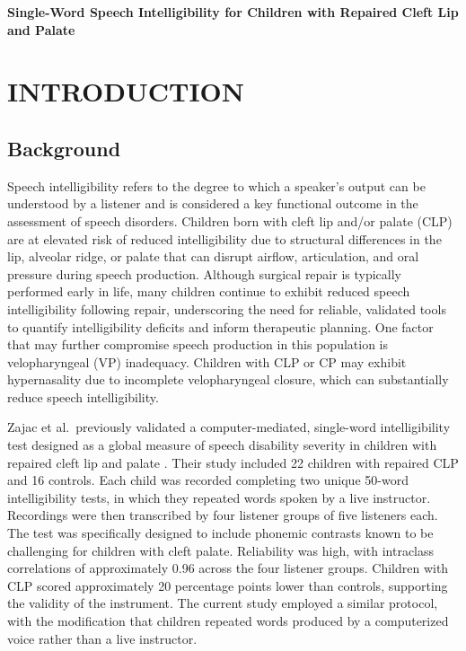 \documentclass[11pt]{article}
\begin{document}
\doublespacing

\begin{center}
{\large\textbf{Single-Word Speech Intelligibility for Children
with Repaired Cleft Lip and Palate}}
\end{center}

\section*{INTRODUCTION}\label{sec:intro}
\subsection*{Background}
Speech intelligibility refers to the degree to which a speaker's output can
be understood by a listener and is considered a key functional outcome in the
assessment of speech disorders. Children born with cleft lip and/or palate
(CLP) are at elevated risk of reduced intelligibility due to structural
differences in the lip, alveolar ridge, or palate that can disrupt airflow,
articulation, and oral pressure during speech production. Although surgical
repair is typically performed early in life, many children continue to exhibit
reduced speech intelligibility following repair, underscoring the need for
reliable, validated tools to quantify intelligibility deficits and inform
therapeutic planning. One factor that may further compromise speech production
in this population is velopharyngeal (VP) inadequacy. Children with CLP or CP
may exhibit hypernasality due to incomplete velopharyngeal closure, which can
substantially reduce speech intelligibility.

Zajac et al.\ previously validated a computer-mediated, single-word
intelligibility test designed as a global measure of speech disability severity
in children with repaired cleft lip and palate \cite{zajac2011}. Their study
included 22 children with repaired CLP and 16 controls. Each child was recorded
completing two unique 50-word intelligibility tests, in which they repeated
words spoken by a live instructor. Recordings were then transcribed by four
listener groups of five listeners each. The test was specifically designed to
include phonemic contrasts known to be challenging for children with cleft
palate. Reliability was high, with intraclass correlations of approximately
0.96 across the four listener groups. Children with CLP scored approximately
20 percentage points lower than controls, supporting the validity of the
instrument. The current study employed a similar protocol, with the
modification that children repeated words produced by a computerized voice
rather than a live instructor.
\end{document}
